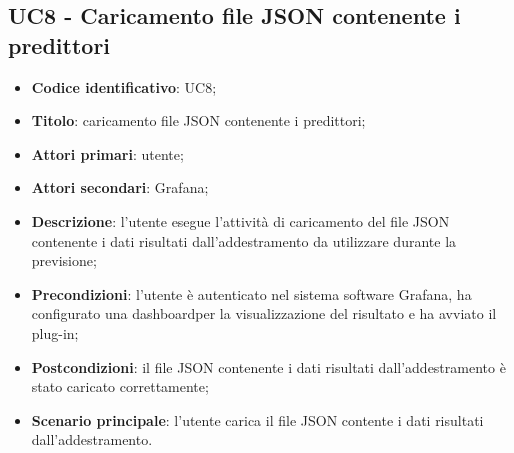 \subsection{UC8 - Caricamento file JSON contenente i predittori}
\begin{itemize}
	\item \textbf{Codice identificativo}: UC8;
	\item \textbf{Titolo}: caricamento file JSON contenente i predittori\glo;
	\item \textbf{Attori primari}: utente;
	\item \textbf{Attori secondari}: Grafana\glo;
	\item \textbf{Descrizione}: l'utente esegue l'attività di caricamento del file JSON contenente i dati risultati dall'addestramento da utilizzare durante la previsione;
	\item \textbf{Precondizioni}: l'utente è autenticato nel sistema software Grafana\glosp, ha configurato una dashboard\glosp per la visualizzazione del risultato e ha avviato il plug-in;
	\item \textbf{Postcondizioni}: il file JSON contenente i dati risultati dall'addestramento è stato caricato correttamente;
	\item \textbf{Scenario principale}: l'utente carica il file JSON contente i dati risultati dall'addestramento.
\end{itemize}